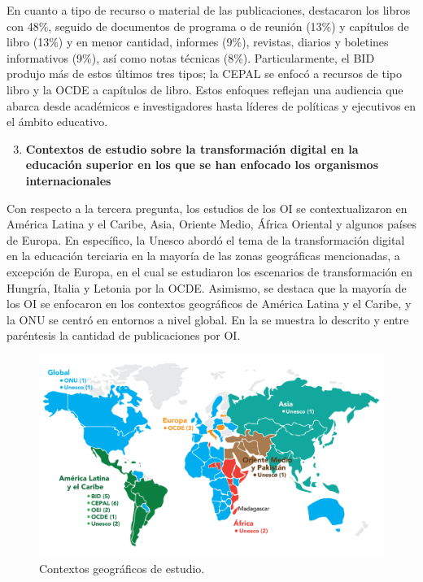 En cuanto a tipo de recurso o material de las publicaciones, destacaron
los libros con 48\%, seguido de documentos de programa o de reunión
(13\%) y capítulos de libro (13\%) y en menor cantidad, informes (9\%),
revistas, diarios y boletines informativos (9\%), así como notas
técnicas (8\%). Particularmente, el BID produjo más de estos últimos
tres tipos; la CEPAL se enfocó a recursos de tipo libro y la OCDE a
capítulos de libro. Estos enfoques reflejan una audiencia que abarca
desde académicos e investigadores hasta líderes de políticas y
ejecutivos en el ámbito educativo.

\begin{enumerate}[label=\textbf{PI\arabic*}]
\setcounter{enumi}{2}
\item
  \textbf{Contextos de estudio sobre la transformación digital en la
  educación superior en los que se han enfocado los organismos
  internacionales}
\end{enumerate}

Con respecto a la tercera pregunta, los estudios de los OI se
contextualizaron en América Latina y el Caribe, Asia, Oriente Medio,
África Oriental y algunos países de Europa. En específico, la Unesco
abordó el tema de la transformación digital en la educación terciaria en
la mayoría de las zonas geográficas mencionadas, a excepción de Europa,
en el cual se estudiaron los escenarios de transformación en Hungría,
Italia y Letonia por la OCDE. Asimismo, se destaca que la mayoría de los
OI se enfocaron en los contextos geográficos de América Latina y el
Caribe, y la ONU se centró en entornos a nivel global. En la  se
muestra lo descrito y entre paréntesis la cantidad de publicaciones por
OI.

\begin{figure}[htpb]
  \centering
  \begin{minipage}{.8\textwidth}
  \includegraphics[width=\textwidth]{figure-03.png}
  \caption{Contextos geográficos de estudio.}
  \label{fig-03}
  \end{minipage}
\end{figure}

